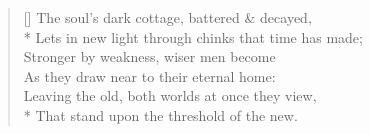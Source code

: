 \documentclass[MAIN]{subfiles}
\begin{document}
\settowidth{\versewidth}{The soul's dark cottage, battered \& decayed,}
\begin{verse}[\versewidth]
The soul's dark cottage, battered \& decayed,\\*
Lets in new light through chinks that time has made;\\
Stronger by weakness, wiser men become\\
As they draw near to their eternal home:\\
Leaving the old, both worlds at once they view,\\*
That stand upon the threshold of the new.
\end{verse}
\end{document}
